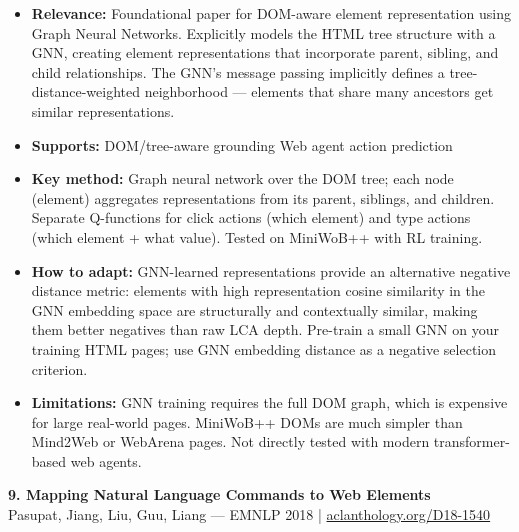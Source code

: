 \documentclass[pdflatex,sn-mathphys-num]{sn-jnl}
\theoremstyle{thmstyleone}
\theoremstyle{thmstyletwo}
\theoremstyle{thmstylethree}
\begin{document}
\begin{itemize}
    \item \textbf{Relevance:} Foundational paper for DOM-aware element representation using Graph Neural Networks. Explicitly models the HTML tree structure with a GNN, creating element representations that incorporate parent, sibling, and child relationships. The GNN's message passing implicitly defines a tree-distance-weighted neighborhood --- elements that share many ancestors get similar representations.
    \item \textbf{Supports:} \checkmark DOM/tree-aware grounding \checkmark Web agent action prediction
    \item \textbf{Key method:} Graph neural network over the DOM tree; each node (element) aggregates representations from its parent, siblings, and children. Separate Q-functions for click actions (which element) and type actions (which element + what value). Tested on MiniWoB++ with RL training.
    \item \textbf{How to adapt:} GNN-learned representations provide an alternative negative distance metric: elements with high representation cosine similarity in the GNN embedding space are structurally and contextually similar, making them better negatives than raw LCA depth. Pre-train a small GNN on your training HTML pages; use GNN embedding distance as a negative selection criterion.
    \item \textbf{Limitations:} GNN training requires the full DOM graph, which is expensive for large real-world pages. MiniWoB++ DOMs are much simpler than Mind2Web or WebArena pages. Not directly tested with modern transformer-based web agents.
\end{itemize}

\textbf{9. Mapping Natural Language Commands to Web Elements} \\
Pasupat, Jiang, Liu, Guu, Liang --- EMNLP 2018 | \href{https://aclanthology.org/D18-1540}{aclanthology.org/D18-1540}
\end{document}
